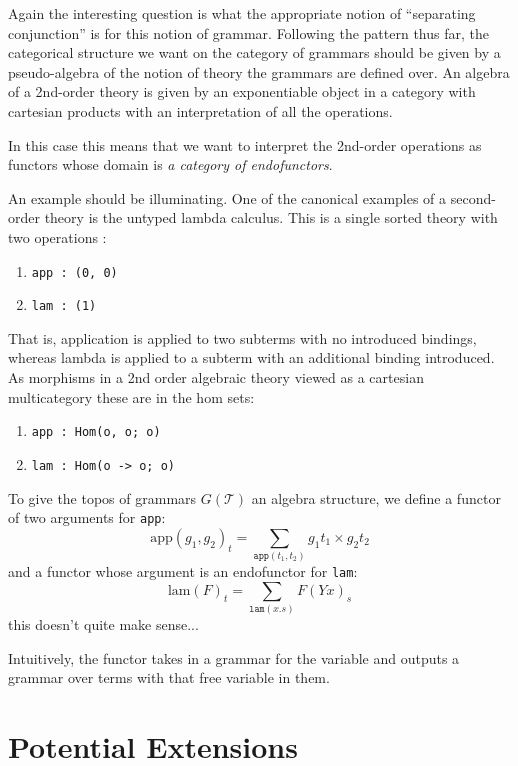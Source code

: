 \documentclass[12pt]{article}
\begin{document}
Again the interesting question is what the appropriate notion of
``separating conjunction'' is for this notion of grammar. Following
the pattern thus far, the categorical structure we want on the
category of grammars should be given by a pseudo-algebra of the notion
of theory the grammars are defined over. An algebra of a 2nd-order
theory is given by an exponentiable object in a category with
cartesian products with an interpretation of all the operations.

In this case this means that we want to interpret the 2nd-order
operations as functors whose domain is \emph{a category of
endofunctors}.

An example should be illuminating. One of the canonical examples of a
second-order theory is the untyped lambda calculus. This is a single
sorted theory with two operations :

\begin{enumerate}
\item \texttt{app : (0, 0)}
\item \texttt{lam : (1)}
\end{enumerate}

That is, application is applied to two subterms with no introduced
bindings, whereas lambda is applied to a subterm with an additional
binding introduced.  As morphisms in a 2nd order algebraic theory
viewed as a cartesian multicategory these are in the hom sets:

\begin{enumerate}
\item \texttt{app : Hom(o, o; o)}
\item \texttt{lam : Hom(o -> o; o)}
\end{enumerate}

To give the topos of grammars $G(\mathcal T)$ an algebra structure, we
define a functor of two arguments for \texttt{app}:
\[ \textrm{app}(g_1,g_2)_t = \sum_{\texttt{app}(t_1,t_2)} g_1 t_1 \times g_2 t_2 \]
and a functor whose argument is an endofunctor for \texttt{lam}:
\[ \textrm{lam}(F)_t = \sum_{\texttt{lam}(x.s)} F(Y x)_s \]
this doesn't quite make sense...

Intuitively, the functor takes in a grammar for the variable and
outputs a grammar over terms with that free variable in them.

\section{Potential Extensions}
\end{document}
